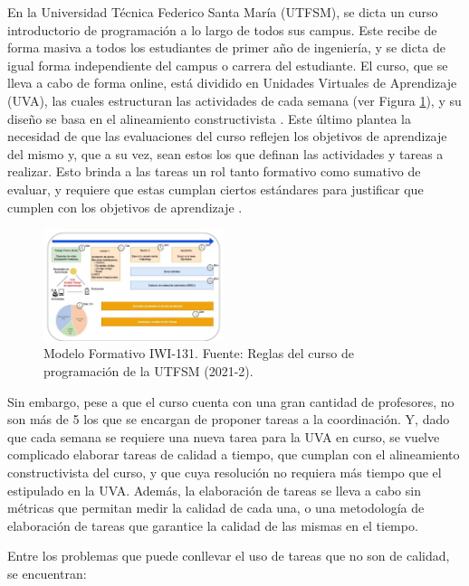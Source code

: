 \documentclass[conference]{IEEEtran}
\begin{document}
En la Universidad Técnica Federico Santa María (UTFSM), se dicta un curso introductorio de programación a lo largo de todos sus campus. Este recibe de forma masiva a todos los estudiantes de primer año de ingeniería, y se dicta de igual forma independiente del campus o carrera del estudiante. El curso, que se lleva a cabo de forma online, está dividido en Unidades Virtuales de Aprendizaje (UVA), las cuales estructuran las actividades de cada semana (ver Figura \ref{modeloiwi}), y su diseño se basa en el alineamiento constructivista \cite{book}. Este último plantea la necesidad de que las evaluaciones del curso reflejen los objetivos de aprendizaje del mismo y, que a su vez, sean estos los que definan las actividades y tareas a realizar. Esto brinda a las tareas un rol tanto formativo como sumativo de evaluar, y requiere que estas cumplan ciertos estándares para justificar que cumplen con los objetivos de aprendizaje \cite{book}. 

\begin{figure}[H]
    \centering
    \includegraphics[width=0.47\textwidth]{uva.png}
    \caption{Modelo Formativo IWI-131. Fuente: Reglas del curso de programación de la UTFSM (2021-2).}
    \label{modeloiwi}
\end{figure}

Sin embargo, pese a que el curso cuenta con una gran cantidad de profesores, no son más de 5 los que se encargan de proponer tareas a la coordinación. Y, dado que cada semana se requiere una nueva tarea para la UVA en curso, se vuelve complicado elaborar tareas de calidad a tiempo, que cumplan con el alineamiento constructivista del curso, y que cuya resolución no requiera más tiempo que el estipulado en la UVA. Además, la elaboración de tareas se lleva a cabo sin métricas que permitan medir la calidad de cada una, o una metodología de elaboración de tareas que garantice la calidad de las mismas en el tiempo.

Entre los problemas que puede conllevar el uso de tareas que no son de calidad, se encuentran:
\end{document}
